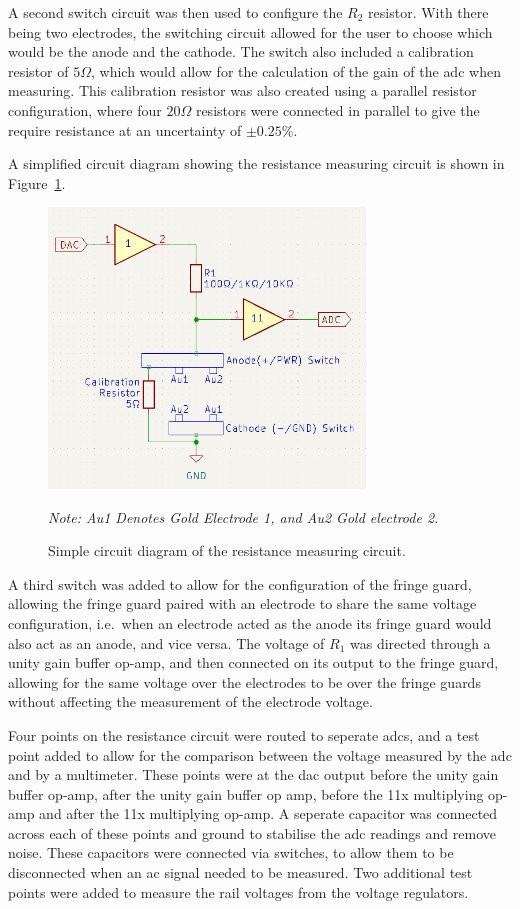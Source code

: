 A second switch circuit was then used to configure the $R_2$ resistor.
With there being two electrodes, the switching circuit allowed for the user to choose which would be the anode and the cathode.
The switch also included a calibration resistor of $5\Omega$, which would allow for the calculation of the gain of the \gls{adc} when measuring.
This calibration resistor was also created using a parallel resistor configuration, where four $20\Omega$ resistors were connected in parallel to give the require resistance at an uncertainty of $\pm0.25\%$.

A simplified circuit diagram showing the resistance measuring circuit is shown in Figure~\ref{fig:resistance_circuit}.

\begin{figure}[H]\label{fig:resistance_circuit}
    \centering
    \includegraphics[width=0.75\textwidth]{figures/fig_resistance_circuit.png}
    \caption{Simple circuit diagram of the resistance measuring circuit.}
    \textit{Note: Au1 Denotes Gold Electrode 1, and Au2 Gold electrode 2.}
\end{figure}

A third switch was added to allow for the configuration of the fringe guard, allowing the fringe guard paired with an electrode to share the same voltage configuration, i.e.~when an electrode acted as the anode its fringe guard would also act as an anode, and vice versa.
The voltage of $R_1$ was directed through a unity gain buffer op-amp, and then connected on its output to the fringe guard, allowing for the same voltage over the electrodes to be over the fringe guards without affecting the measurement of the electrode voltage.

Four points on the resistance circuit were routed to seperate \gls{adc}s, and a test point added to allow for the comparison between the voltage measured by the \gls{adc} and by a multimeter.
These points were at the \gls{dac} output before the unity gain buffer op-amp, after the unity gain buffer op amp, before the 11x multiplying op-amp and after the 11x multiplying op-amp.
A seperate capacitor was connected across each of these points and ground to stabilise the \gls{adc} readings and remove noise.
These capacitors were connected via switches, to allow them to be disconnected when an \gls{ac} signal needed to be measured.
Two additional test points were added to measure the rail voltages from the voltage regulators.

